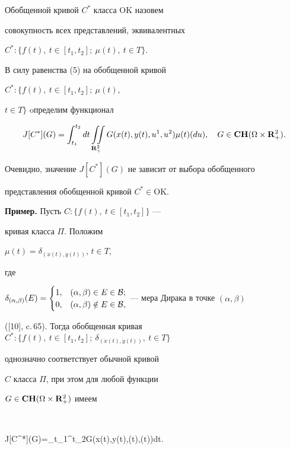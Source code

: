 Обобщенной кривой $C^*$ класса $\mathrm{OK}$ назовем


совокупность всех представлений, эквивалентных


$C^*:\{f(t),\ t\in[t_1,t_2];\ \mu(t),\ t\in T\}$.





В силу равенства (5) на обобщенной кривой


$C^*:\{f(t),\ t\in[t_1,t_2];\ \mu(t)$,


$t\in T\}$ oпределим функционал


$$


J[C^*](G)=\int_{t_1}^{t_2}dt\iint\limits_{ {\bold R}


^2_+}G(x(t),y(t),u^1,u^2)\mu(t)(du),\quad


G\in \bold{CH}(\Omega \times {\bold R}^2_+).


$$


Очевидно, значение $J[C^*](G)$ не зависит от выбора обобщенного


представления обобщенной кривой $C^*\in \mathrm{OK}$.





{\bf Пример.} Пусть $C:\{f(t),\ t\in[t_1,t_2]\}$ ---


кривая класса $\Pi$. Положим


$\mu(t)=\delta_{(\Dot{x}(t),\Dot{y}(t))}$, $t\in T$,


где


$\delta_{(\alpha,\beta)}(E)=


\begin{cases}


1, & (\alpha, \beta) \in E \in {\cal B};\\


0, & (\alpha, \beta) \notin E \in {\cal B},


\end{cases}$ --- мера Дирака в точке $(\alpha , \beta)$


([10], c.\,65). Тогда обобщенная кривая $C^*:\{f(t),\ t\in [t_1,t_2];


\ \delta_{(\Dot{x}(t),\Dot{y}(t))},\ t\in T\}$


однозначно соответствует обычной кривой


$C$ класса $\Pi$, при этом для любой функции


$G\in \bold{CH}(\Omega \times {\bold R}^2_+)$ имеем


$$


J[C^*](G)=\int_{t_1}^{t_2}G(x(t),y(t),(t),(t))dt.


